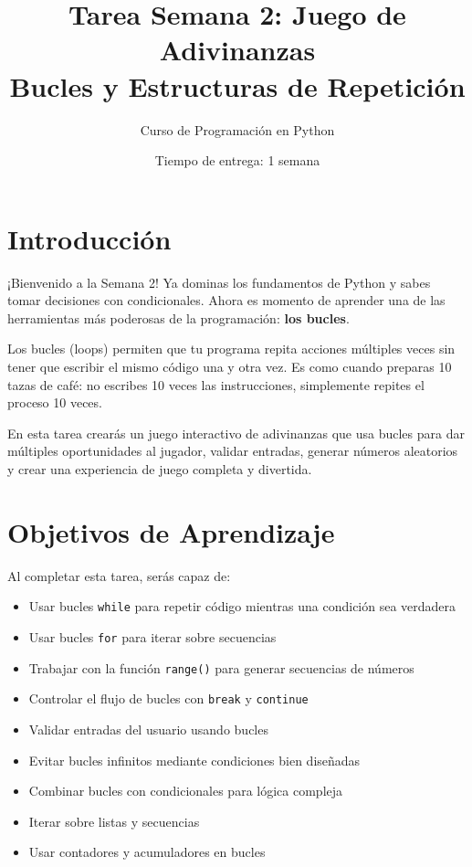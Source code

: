 \documentclass[12pt,a4paper]{article}
\title{\textbf{Tarea Semana 2: Juego de Adivinanzas}\\
\large Bucles y Estructuras de Repetición}
\author{Curso de Programación en Python}
\date{Tiempo de entrega: 1 semana}
\begin{document}
\maketitle

\section{Introducción}

¡Bienvenido a la Semana 2! Ya dominas los fundamentos de Python y sabes tomar decisiones con condicionales. Ahora es momento de aprender una de las herramientas más poderosas de la programación: \textbf{los bucles}.

Los bucles (loops) permiten que tu programa repita acciones múltiples veces sin tener que escribir el mismo código una y otra vez. Es como cuando preparas 10 tazas de café: no escribes 10 veces las instrucciones, simplemente repites el proceso 10 veces.

En esta tarea crearás un juego interactivo de adivinanzas que usa bucles para dar múltiples oportunidades al jugador, validar entradas, generar números aleatorios y crear una experiencia de juego completa y divertida.

\section{Objetivos de Aprendizaje}

Al completar esta tarea, serás capaz de:

\begin{itemize}[leftmargin=*]
    \item Usar bucles \texttt{while} para repetir código mientras una condición sea verdadera
    \item Usar bucles \texttt{for} para iterar sobre secuencias
    \item Trabajar con la función \texttt{range()} para generar secuencias de números
    \item Controlar el flujo de bucles con \texttt{break} y \texttt{continue}
    \item Validar entradas del usuario usando bucles
    \item Evitar bucles infinitos mediante condiciones bien diseñadas
    \item Combinar bucles con condicionales para lógica compleja
    \item Iterar sobre listas y secuencias
    \item Usar contadores y acumuladores en bucles
\end{itemize}
\end{document}
